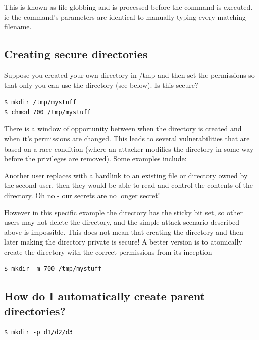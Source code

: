 This is known as file globbing and is processed before the command is executed. ie the command's parameters are identical to manually typing every matching filename.

\subsection{Creating secure directories}\label{creating-secure-directories}

Suppose you created your own directory in /tmp and then set the permissions so that only you can use the directory (see below). Is this secure?

\begin{lstlisting}
$ mkdir /tmp/mystuff
$ chmod 700 /tmp/mystuff
\end{lstlisting}

There is a window of opportunity between when the directory is created and when it's permissions are changed. This leads to several vulnerabilities that are based on a race condition (where an attacker modifies the directory in some way before the privileges are removed). Some examples include:

Another user replaces  with a hardlink to an existing file or directory owned by the second user, then they would be able to read and control the contents of the  directory. Oh no - our secrets are no longer secret!

However in this specific example the  directory has the sticky bit set, so other users may not delete the  directory, and the simple attack scenario described above is impossible. This does not mean that creating the directory and then later making the directory private is secure! A better version is to atomically create the directory with the correct permissions from its inception -

\begin{lstlisting}
$ mkdir -m 700 /tmp/mystuff
\end{lstlisting}

\subsection{How do I automatically create parent directories?}\label{how-do-i-automatically-create-parent-directories}

\begin{lstlisting}
$ mkdir -p d1/d2/d3
\end{lstlisting}

